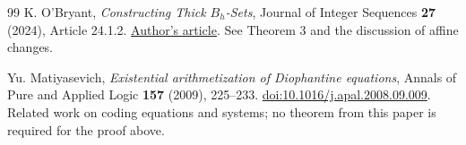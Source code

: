 \documentclass[11pt]{article}
\theoremstyle{definition}
\theoremstyle{remark}
\numberwithin{equation}{section}
\begin{document}
\begin{thebibliography}{99}
K. O'Bryant,
\emph{Constructing Thick \(B_h\)-Sets},
Journal of Integer Sequences \textbf{27} (2024), Article 24.1.2.
\href{https://cs.uwaterloo.ca/journals/JIS/VOL27/OBryant/obry7.pdf}{Author's article}.
See Theorem 3 and the discussion of affine changes.

Yu. Matiyasevich,
\emph{Existential arithmetization of Diophantine equations},
Annals of Pure and Applied Logic \textbf{157} (2009), 225--233.
\href{https://doi.org/10.1016/j.apal.2008.09.009}{doi:10.1016/j.apal.2008.09.009}.
Related work on coding equations and systems; no theorem from this paper
is required for the proof above.

\end{thebibliography}
\end{document}
